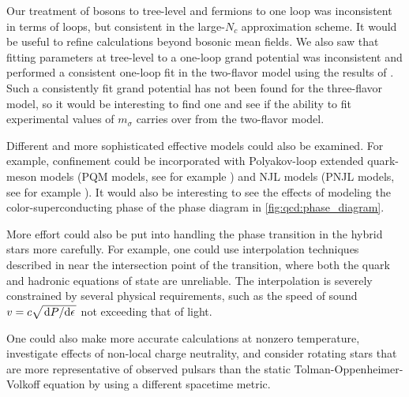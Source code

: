 Our treatment of bosons to tree-level and fermions to one loop was inconsistent in terms of loops,
but consistent in the large-$N_c$ approximation scheme.
It would be useful to refine calculations beyond bosonic mean fields.
We also saw that fitting parameters at tree-level to a one-loop grand potential was inconsistent
and performed a consistent one-loop fit in the two-flavor model using the results of \cite{ref:jo_lsm_consistent_chiral,ref:jo_lsm_consistent_physical}.
Such a consistently fit grand potential has not been found for the three-flavor model,
so it would be interesting to find one and see if the ability to fit experimental values of $m_\sigma$ carries over from the two-flavor model.

Different and more sophisticated effective models could also be examined.
For example, confinement could be incorporated with Polyakov-loop extended quark-meson models (PQM models, see for example \cite{ref:pqm_2f,ref:pqm_3f,ref:master_folkestad}) and NJL models (PNJL models, see for example \cite{ref:pnjl_2f,ref:pnjl_3f,ref:pnjl_3f_zeroT}).
It would also be interesting to see the effects of modeling the color-superconducting phase of the phase diagram in \cref{fig:qcd:phase_diagram}.

More effort could also be put into handling the phase transition in the hybrid stars more carefully.
For example, one could use interpolation techniques described in \cite{ref:quark_star_review}
near the intersection point of the transition,
where both the quark and hadronic equations of state are unreliable.
The interpolation is severely constrained by several physical requirements,
such as the speed of sound $v = c \sqrt{\odv{P}/{\epsilon}}$ not exceeding that of light.

One could also make more accurate calculations at nonzero temperature,
investigate effects of non-local charge neutrality,
and consider rotating stars that are more representative of observed pulsars than the static Tolman-Oppenheimer-Volkoff equation by using a different spacetime metric.
